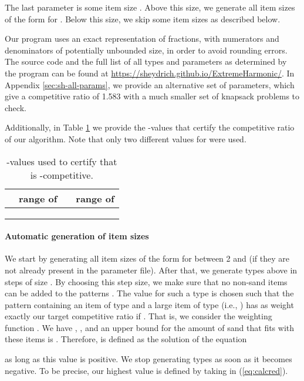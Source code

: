The last parameter is some item size .
Above this size, 
we generate all item sizes of the form  for . 
Below this size, we skip some item sizes as described below.


Our program uses an exact representation of fractions, with numerators and denominators of potentially unbounded size, in order to avoid rounding errors. 
The source code and the full list of all types and parameters as determined by the program can be found at  \url{https://sheydrich.github.io/ExtremeHarmonic/}. 
In Appendix \ref{sec:sh-all-params}, we provide an alternative set of parameters, which give a competitive ratio of 1.583 with a much smaller set of knapsack problems to check.

Additionally, in Table \ref{tab:sonofharm-y3} we provide the -values that certify the competitive ratio of our algorithm. Note that only two different values for  were used.

\begin{table}[h]
	\caption{-values used to certify that \SonofH{} is -competitive.}
	\label{tab:sonofharm-y3}
	\centering
		\begin{tabular}{|r|l||r|l|}\hline
			 & range of  &  & range of  \\\hline
			 &  &  & \\
			&  && \\
			&  && \\\hline
\end{tabular}
\end{table}




\paragraph{Automatic generation of item sizes}\label{sec:automatic-size-generation}
We start by generating all item sizes of the form  for  between 2 and  (if they are not already present in the parameter file). After that, we generate types above  in steps of size . By choosing this step size, we make sure that no non-sand items can be added to the patterns . 
The value  for such a type  is chosen such that the pattern containing an item  of type  and a large item  of type  (i.e., ) has as weight exactly our target competitive ratio if .
That is, we consider the weighting function . We have , , and an upper bound for the amount of sand that fits with these items is 
. Therefore,  is defined as the solution of the equation

as long as this value is positive. We stop generating types as soon as it becomes negative.
To be precise, our highest value  is defined by taking  in (\ref{eq:calcred}).

